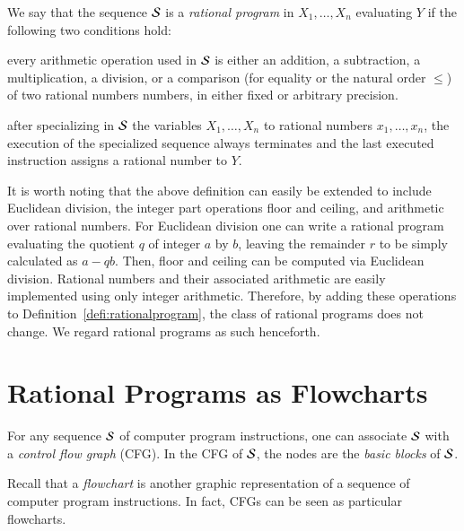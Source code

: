 \begin{definition}
\label{defi:rationalprogram}
We say that the sequence ${\cal S}$ is a
{\em rational program} in $X_1, \ldots, X_n$ evaluating $Y$
if the following two conditions hold:
\begin{enumerateshort}
\item every arithmetic operation used in ${\cal S}$ is either an addition,
  a subtraction, a multiplication, a division, 
  or a comparison (for equality or the natural order $\le$)
  of two rational numbers numbers, in either fixed or arbitrary precision.
\item after specializing in ${\cal S}$ the variables $X_1, \ldots, X_n$ to
      rational numbers $x_1, \ldots, x_n$, the execution of the 
      specialized sequence always terminates and the last
      executed instruction assigns a rational number to $Y$.
\end{enumerateshort}
\end{definition}

It is worth noting that the above 
definition can easily be extended to include
Euclidean division, the integer part operations floor and ceiling,
and arithmetic over rational numbers.
For Euclidean division one can write a rational program
evaluating the quotient $q$ of integer $a$ by $b$, 
leaving the remainder $r$ to be simply calculated as $a - qb$.
Then, floor and ceiling can be computed via Euclidean division.
Rational numbers and their associated arithmetic are easily implemented using
only integer arithmetic.
Therefore, by adding these operations to 
Definition~\ref{defi:rationalprogram}, the 
class of rational programs does not change.
We regard rational programs as such henceforth.

\section{Rational Programs as Flowcharts}

For any sequence ${\cal S}$ of computer program 
instructions, one can associate  ${\cal S}$
with a {\em control flow graph} (CFG).
In the CFG of ${\cal S}$, the nodes are the {\em basic blocks} of ${\cal S}$.
\iffalse 
the sub-sequences of ${\cal S}$ such that 
\begin{enumerate}[(i)]
	\item  each instruction except the last one is not a branch, and
	\item which are maximum in length with property (i).
\end{enumerate}
Moreover, in the CFG of ${\cal S}$, 
there is a directed edge from a basic block $B_1$ to a basic block
$B_2$ whenever, during the execution of ${\cal S}$, one can jump from
the last instruction of $B_1$ to the first instruction of $B_2$.
\fi
Recall that  a {\em flowchart} is another
graphic representation of a sequence of computer program  instructions.
In fact, CFGs can be seen as particular flowcharts.

